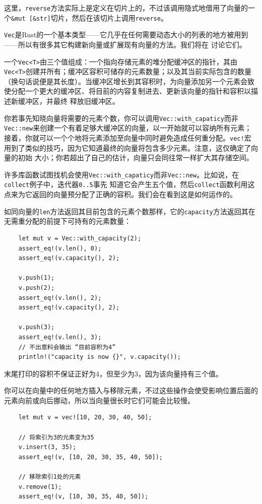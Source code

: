 \smallskip
这里，\texttt{reverse}方法实际上是定义在切片上的，不过该调用隐式地借用了向量的一个\texttt{\&mut [\&str]}切片，然后在该切片上调用\texttt{reverse}。

\medskip
\texttt{Vec}是Rust的一个基本类型------它几乎在任何需要动态大小的列表的地方被用到------所以有很多其它构建新向量或扩展现有向量的方法。我们将在
讨论它们。

\medskip
一个\texttt{Vec<T>}由三个值组成：一个指向存储元素的堆分配缓冲区的指针，其由\texttt{Vec<T>}创建并所有；缓冲区容积可储存的元素数量；以及其当前实际包含的数量
（换句话说便是其长度）。当缓冲区增长到其容积时，为向量添加另一个元素会致使分配一个更大的缓冲区、将目前的内容复制进去、更新该向量的指针和容积以描述新缓冲区，并最终
释放旧缓冲区。

\medskip
你若事先知晓向量将需要的元素个数，你可以调用\texttt{Vec::with\_capaticy}而非\texttt{Vec::new}来创建一个有着足够大缓冲区的向量，以一开始就可以容纳所有元素；
接着，你就可以一个个地将元素添加至向量中同时避免造成任何重分配。\texttt{vec!}宏用到了类似的技巧，因为它知道最终的向量将包含多少元素。注意，这仅确定了向量的初始
大小；你若超出了自己的估计，向量只会同往常一样扩大其存储空间。

\medskip
许多库函数试图找机会使用\texttt{Vec::with\_capaticy}而非\texttt{Vec::new}。比如说，在\texttt{collect}例子中，迭代器\texttt{0..5}事先
知道它会产生五个值，然后\texttt{collect}函数利用这点来为它返回的向量预分配了正确的容积。我们会在看到这是如何运作的。

\medskip
如同向量的\texttt{len}方法返回其目前包含的元素个数那样，它的\texttt{capacity}方法返回其在无需重分配的前提下可持有的元素数量：
\begin{verbatim}
    let mut v = Vec::with_capacity(2);
    assert_eq!(v.len(), 0);
    assert_eq!(v.capacity(), 2);

    v.push(1);
    v.push(2);
    assert_eq!(v.len(), 2);
    assert_eq!(v.capacity(), 2);

    v.push(3);
    assert_eq!(v.len(), 3);
    // 不出意料会输出 “目前容积为4”
    println!("capacity is now {}", v.capacity());
\end{verbatim}
 
\smallskip
末尾打印的容积不保证正好为4，但至少为3，因为该向量持有三个值。

\medskip
你可以在向量中的任何地方插入与移除元素，不过这些操作会使受影响位置后面的元素向前或向后挪动，所以当向量很长时它们可能会比较慢。
\begin{verbatim}
    let mut v = vec![10, 20, 30, 40, 50];

    // 将索引为3的元素变为35
    v.insert(3, 35);
    assert_eq!(v, [10, 20, 30, 35, 40, 50]);

    // 移除索引1处的元素
    v.remove(1);
    assert_eq!(v, [10, 30, 35, 40, 50]);
\end{verbatim}
 
